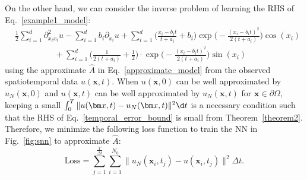 \begin{example}

On the other hand, we can consider the inverse problem of learning the RHS of Eq.~\eqref{example1_model}:
\begin{equation}
\begin{aligned}
&\frac{1}{2}\sum_{i=1}^d \partial_{x_ix_i}^2u - \sum_{i=1}^d b_i \partial_{x_i}u 
    + \sum_{i=1}^d \big(\frac{x_i-b_it}{t+a_i} + b_i\big)\exp\Big(- \frac{(x_i - b_it)^2}{2(t+a_i)}\Big) \cos(x_i) \\
 &\hspace{2cm}   + \sum_{i=1}^d\big(\frac{1}{2(t+a_i)}+\frac{1}{2}\big)\cdot\exp\Big(- \frac{(x_i - b_it)^2}{ 2(t+a_i)}\Big) \sin(x_i)
    \end{aligned}
    \label{inverse_learn}
\end{equation}
using the approximate $\hat{A}$ in Eq.~\eqref{approximate_model} from the observed spatiotemporal data $u(\bm{x}, t)$. When $u(\bm{x}, 0)$ can be well approximated by $u_N(\bm{x}, 0)$ and $u(\bm{x}, t)$ can be well approximated by $u_N(\bm{x}, t)$ for $\bm x\in\partial\Omega$, keeping a small $\int_0^T \|u(\bm x, t)-u_N(\bm x, t)\|^2\d t$ is a necessary condition such that the RHS of Eq.~\eqref{temporal_error_bound} is small from Theorem~\ref{theorem2}. 
Therefore, we minimize the following loss function to train the NN in Fig.~\ref{fig:snn} to approximate $\hat{A}$:
\begin{equation}
    \text{Loss} = \sum_{j=1}^{\frac{T}{\Delta t}}\sum_{i=1}^{N_0} \|u_N(\bm x_i, t_j) - u(\bm x_i, t_j)\|^2\Delta t.%
    \label{loss_rbf_inverse}
\end{equation}


\end{example}
